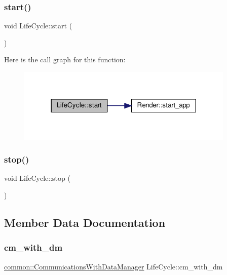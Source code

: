 \subsubsection{\texorpdfstring{start()}{start()}}
{\footnotesize\ttfamily void Life\+Cycle\+::start (\begin{DoxyParamCaption}{ }\end{DoxyParamCaption})}

Here is the call graph for this function\+:
\nopagebreak
\begin{figure}[H]
\begin{center}
\leavevmode
\includegraphics[width=294pt]{classLifeCycle_a75a15308cad92f73d7bc9cec52419e41_cgraph}
\end{center}
\end{figure}
\mbox{\label{classLifeCycle_ae61435e991fe8b1847ca2e3553806dc4}} 
\subsubsection{\texorpdfstring{stop()}{stop()}}
{\footnotesize\ttfamily void Life\+Cycle\+::stop (\begin{DoxyParamCaption}{ }\end{DoxyParamCaption})}



\subsection{Member Data Documentation}
\mbox{\label{classLifeCycle_a9acd28aae430a04204bf81ab676e0cd7}} 
\subsubsection{\texorpdfstring{cm\+\_\+with\+\_\+dm}{cm\_with\_dm}}
{\footnotesize\ttfamily \mbox{\hyperlink{classcommon_1_1CommunicationsWithDataManager}{common\+::\+Communications\+With\+Data\+Manager}} Life\+Cycle\+::cm\+\_\+with\+\_\+dm\hspace{0.3cm}{\ttfamily [private]}}

